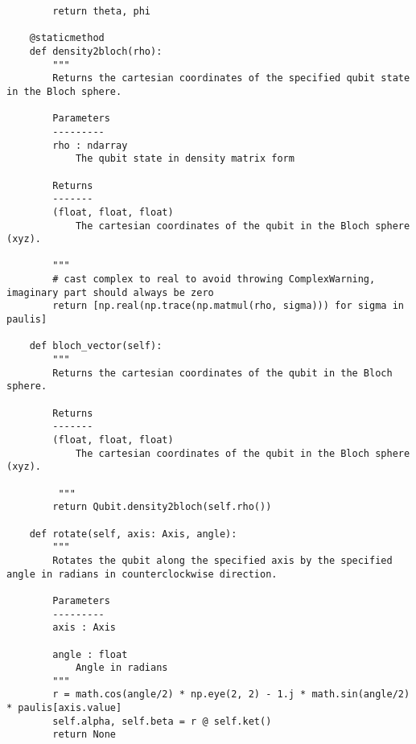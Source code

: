 \begin{verbatim}
        return theta, phi

    @staticmethod
    def density2bloch(rho):
        """
        Returns the cartesian coordinates of the specified qubit state in the Bloch sphere.

        Parameters
        ---------
        rho : ndarray
            The qubit state in density matrix form

        Returns
        -------
        (float, float, float)
            The cartesian coordinates of the qubit in the Bloch sphere (xyz).

        """
        # cast complex to real to avoid throwing ComplexWarning, imaginary part should always be zero
        return [np.real(np.trace(np.matmul(rho, sigma))) for sigma in paulis]

    def bloch_vector(self):
        """
        Returns the cartesian coordinates of the qubit in the Bloch sphere.

        Returns
        -------
        (float, float, float)
            The cartesian coordinates of the qubit in the Bloch sphere (xyz).

         """
        return Qubit.density2bloch(self.rho())

    def rotate(self, axis: Axis, angle):
        """
        Rotates the qubit along the specified axis by the specified angle in radians in counterclockwise direction.

        Parameters
        ---------
        axis : Axis

        angle : float
            Angle in radians
        """
        r = math.cos(angle/2) * np.eye(2, 2) - 1.j * math.sin(angle/2) * paulis[axis.value]
        self.alpha, self.beta = r @ self.ket()
        return None
\end{verbatim}
\newpage
